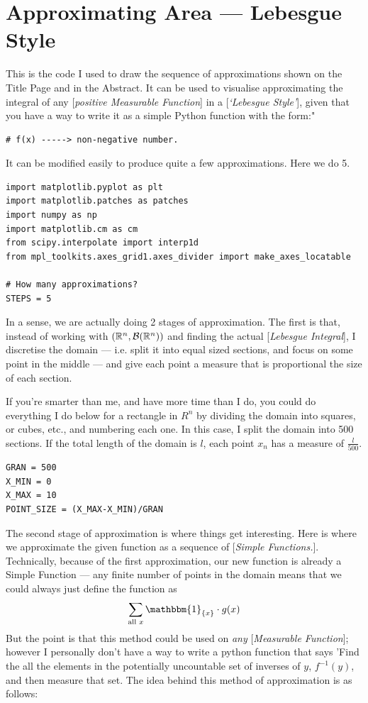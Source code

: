\newpage
\section{Approximating Area --- Lebesgue Style}

This is the code I used to draw the sequence of approximations shown on the Title Page and in the Abstract. It can be used to visualise approximating the integral of any [\emph{positive Measurable Function}] in a [\emph{`Lebesgue Style'}], given that you have a way to write it as a simple Python function with the form:"

\begin{verbatim}
# f(x) -----> non-negative number.
\end{verbatim}

It can be modified easily to produce quite a few approximations. Here we do 5.

\begin{verbatim}
import matplotlib.pyplot as plt
import matplotlib.patches as patches
import numpy as np
import matplotlib.cm as cm
from scipy.interpolate import interp1d
from mpl_toolkits.axes_grid1.axes_divider import make_axes_locatable

# How many approximations?
STEPS = 5
\end{verbatim}

In a sense, we are actually doing 2 stages of approximation. The first is that, instead of working with $(\mathbb{R}^n, \mathcal{B}(\mathbb{R}^n))$ and finding the actual [\emph{Lebesgue Integral}], I discretise the domain --- i.e. split it into equal sized sections, and focus on some point in the middle --- and give each point a measure that is proportional the size of each section.

\medskip
If you're smarter than me, and have more time than I do, you could do everything I do below for a rectangle in $R^n$ by dividing the domain into squares, or cubes, etc., and numbering each one. In this case, I split the domain into 500 sections. If the total length of the domain is $l$, each point $x_n$ has a measure of $\frac{l}{500}$. 

\begin{verbatim}
GRAN = 500
X_MIN = 0
X_MAX = 10
POINT_SIZE = (X_MAX-X_MIN)/GRAN
\end{verbatim}

The second stage of approximation is where things get interesting. Here is where we approximate the given function as a sequence of [\emph{Simple Functions.}]. Technically, because of the first approximation, our new function is already a Simple Function --- any finite number of points in the domain means that we could always just define the function as $$\sum_{\text{all } x}\mathbbm{1}_{\{x\}}\cdot g(x) $$ 
But the point is that this method could be used on \emph{any} [\emph{Measurable Function}]; however I personally don't have a way to write a python function that says 'Find the all the elements in the potentially uncountable set of inverses of $y$, $f^{-1}(y)$, and then measure that set. The idea behind this method of approximation is as follows:

